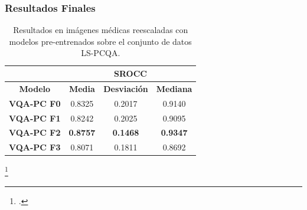 \begin{frame}
  \frametitle{Resultados Finales}
\begin{table}[H]
  \small 
  \centering
\begin{tabular}{|c|c|c|c|}
\hline
\rowcolor[HTML]{FFC702}
                       & \multicolumn{3}{c|}{\textbf{SROCC}}                                                                                                          \\ \hline
\rowcolor[HTML]{FFC702}
\textbf{Modelo}    & \textbf{Media} & \textbf{Desviación} & \textbf{Mediana} \\ \hline
\textbf{VQA-PC F0} & 0.8325           & 0.2017              & 0.9140           \\ \hline
\textbf{VQA-PC F1} & 0.8242           & 0.2025              & 0.9095           \\ \hline
\textbf{VQA-PC F2} & \textbf{0.8757}  & \textbf{0.1468}     & \textbf{0.9347}  \\ \hline
\textbf{VQA-PC F3} & 0.8071           & 0.1811              & 0.8692           \\ \hline
\end{tabular}
\caption[Resultados en imágenes médicas reescaladas entrenando en LS-PCQA.]{
  Resultados en imágenes médicas reescaladas con modelos pre-entrenados 
  sobre el conjunto de datos LS-PCQA\footnotemark[10]. 
}\label{tab:LS-PCQA-FN}
\end{table}
\footcitetext{ResSCNN}
\end{frame}


